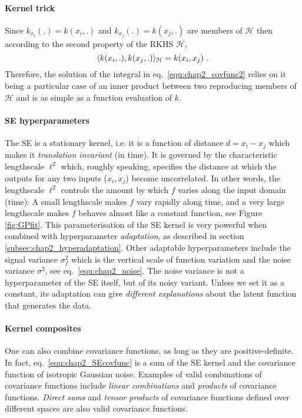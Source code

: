 	\paragraph{Kernel trick} Since $k_{x_i}(.) = k(x_i,.)$ and $k_{x_j}(.) = k(x_j,.)$ are members of
	$\mathcal{H}$ then according to the second property of the RKHS $\mathcal{H}$,
	\begin{equation*}
	  \langle k(x_i,.),k(x_j,.) \rangle_{\mathcal{H}} = k(x_i,x_j) ~.
	\end{equation*}
	Therefore, the solution of the integral in eq.~\eqref{equ:chap2_covfunc2} relies on it being a particular 
	case of an inner product between two reproducing members of
	$\mathcal{H}$ and is as simple as a function evaluation of $k$.

	\paragraph{SE hyperparameters} The SE is a stationary kernel, i.e. it is a function of distance
	$d = x_i - x_j$ which makes it \textit{translation invariant} (in time).
	It is governed by the characteristic lengthscale $\ell^2$ which, roughly speaking, specifies the distance at which
	the outputs for any two inputs ($x_i,x_j$) become uncorrelated. In other words, the lengthscale
	$\ell^2$ controls the amount by which $f$ varies along the input domain (time): A small
	lengthscale makes $f$ vary rapidly along time, and a very large
	lengthscale makes $f$ behaves almost like a constant function, see Figure \ref{fig:GPfit}.
	This parameterisation of the SE kernel is very powerful
	when combined  with hyperparameter \textit{adaptation}, as described in section \ref{subsec:chap2_hyperadaptation}.
	Other adaptable hyperparameters include the signal
	variance $\sigma^2_f$ which is the vertical scale of function variation
	and the noise variance $\sigma^2$, see eq.~\eqref{equ:chap2_noise}.
	The noise variance is not a hyperparameter of the SE itself, but of its noisy variant.
	Unless we set it as a constant, its adaptation can give \textit{different explanations}
	about the latent function that generates the data.

	\paragraph{Kernel composites} One can also combine covariance functions, as long as they are
	positive-definite. In fact, eq.~\eqref{equ:chap2_SEcovfunc} is a sum
	of the SE kernel and the covariance function of isotropic Gaussian noise.
	Examples of valid combinations of covariance functions include \textit{linear
	combinations} and \textit{products} of covariance functions. \textit{Direct sums} and \textit{tensor
	products} of covariance functions defined over different spaces are also valid covariance functions.

